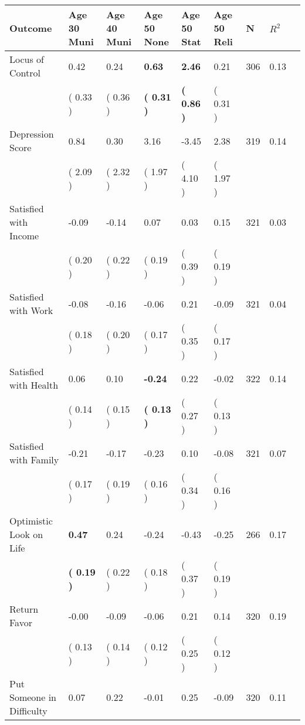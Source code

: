 \begin{tabular}{L{6.2cm} C{1.8cm} C{1.8cm} C{1.8cm} C{1.8cm} C{1.8cm} C{1.8cm} C{0.3cm} C{0.3cm}}
\toprule
 \textbf{Outcome} & \textbf{Age 30 Muni} & \textbf{Age 40 Muni} & \textbf{Age 50 None} & \textbf{Age 50 Stat} & \textbf{Age 50 Reli} & \textbf{N} & \textbf{$ R^2$} \\
\midrule
Locus of Control &      0.42 &      0.24 & \textbf{     0.63} & \textbf{     2.46} &      0.21  & 306 &       0.13 \\ 
 & (     0.33 ) & (     0.36 ) & \textbf{(     0.31 )} & \textbf{(     0.86 )} & (     0.31 )  & \\
Depression Score &      0.84 &      0.30 &      3.16 &     -3.45 &      2.38  & 319 &       0.14 \\ 
 & (     2.09 ) & (     2.32 ) & (     1.97 ) & (     4.10 ) & (     1.97 )  & \\
Satisfied with Income &     -0.09 &     -0.14 &      0.07 &      0.03 &      0.15  & 321 &       0.03 \\ 
 & (     0.20 ) & (     0.22 ) & (     0.19 ) & (     0.39 ) & (     0.19 )  & \\
Satisfied with Work &     -0.08 &     -0.16 &     -0.06 &      0.21 &     -0.09  & 321 &       0.04 \\ 
 & (     0.18 ) & (     0.20 ) & (     0.17 ) & (     0.35 ) & (     0.17 )  & \\
Satisfied with Health &      0.06 &      0.10 & \textbf{    -0.24} &      0.22 &     -0.02  & 322 &       0.14 \\ 
 & (     0.14 ) & (     0.15 ) & \textbf{(     0.13 )} & (     0.27 ) & (     0.13 )  & \\
Satisfied with Family &     -0.21 &     -0.17 &     -0.23 &      0.10 &     -0.08  & 321 &       0.07 \\ 
 & (     0.17 ) & (     0.19 ) & (     0.16 ) & (     0.34 ) & (     0.16 )  & \\
Optimistic Look on Life & \textbf{     0.47} &      0.24 &     -0.24 &     -0.43 &     -0.25  & 266 &       0.17 \\ 
 & \textbf{(     0.19 )} & (     0.22 ) & (     0.18 ) & (     0.37 ) & (     0.19 )  & \\
Return Favor &     -0.00 &     -0.09 &     -0.06 &      0.21 &      0.14  & 320 &       0.19 \\ 
 & (     0.13 ) & (     0.14 ) & (     0.12 ) & (     0.25 ) & (     0.12 )  & \\
Put Someone in Difficulty &      0.07 &      0.22 &     -0.01 &      0.25 &     -0.09  & 320 &       0.11 \\ 

\end{tabular}
